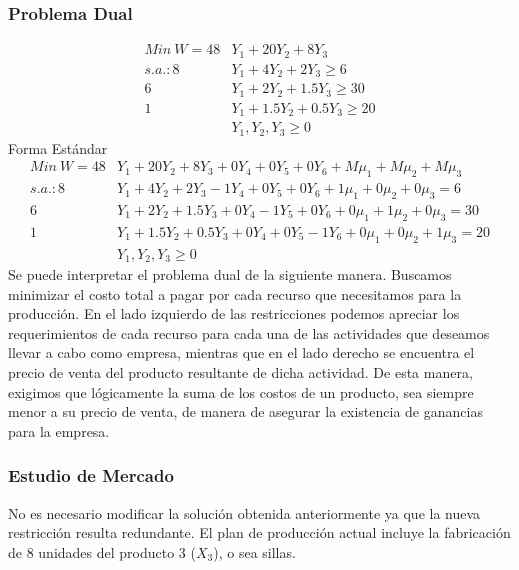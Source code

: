 \begin{homeworkProblem}[1][Dakota]
\subsubsection{Problema Dual}
\begin{align*}
  Min\ W = 48&Y_1 + 20Y_2 + 8Y_3 \\
  s.a.: 8&Y_1 + 4Y_2 + 2Y_3 \ge 6 \\
        6&Y_1 + 2Y_2 + 1.5Y_3 \ge 30 \\
        1&Y_1 + 1.5Y_2 + 0.5Y_3 \ge 20 \\ 
        &Y_1,Y_2,Y_3 \ge 0
\end{align*}
Forma Estándar
\begin{align*}
  Min\ W = 48&Y_1 + 20Y_2 + 8Y_3 + 0Y_4 + 0Y_5 + 0Y_6 + M\mu_1 + M\mu_2 + M\mu_3 \\
  s.a.: 8&Y_1 + 4Y_2 + 2Y_3 - 1Y_4 + 0Y_5 + 0Y_6 + 1\mu_1 + 0\mu_2 + 0\mu_3 = 6\\
        6&Y_1 + 2Y_2 + 1.5Y_3 + 0Y_4 - 1Y_5 + 0Y_6 + 0\mu_1 + 1\mu_2 + 0\mu_3 = 30 \\
        1&Y_1 + 1.5Y_2 + 0.5Y_3 +0Y_4 + 0Y_5 - 1Y_6 + 0\mu_1 + 0\mu_2 + 1\mu_3 = 20   \\ 
        &Y_1,Y_2,Y_3 \ge 0
\end{align*}
Se puede interpretar el problema dual de la siguiente manera. Buscamos minimizar el costo total a pagar por cada recurso que necesitamos para la producción.
En el lado izquierdo de las restricciones podemos apreciar los requerimientos de cada recurso para cada una de las actividades que deseamos llevar a cabo como empresa, mientras
que en el lado derecho se encuentra el precio de venta del producto resultante de dicha actividad. De esta manera, exigimos que lógicamente la suma de los costos de un producto, sea siempre menor a su precio de venta, de manera de asegurar la existencia de ganancias para la empresa.


\subsubsection{Estudio de Mercado}
No es necesario modificar la solución obtenida anteriormente ya que la nueva restricción resulta redundante.
El plan de producción actual incluye la fabricación de 8 unidades del producto 3 ($X_3$), o sea sillas.


\end{homeworkProblem}
